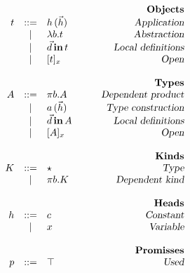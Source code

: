 \begin{figure}

\begin{center}
\begin{math}
\begin{array}{rclr}
&&&\qquad\textsl{\bf Objects}\\
t 

&::=& 
h\,(\vec{h}) 
& \qquad\textsl{Application}
\\

&|&
\lambda b. t
& \qquad\textsl{Abstraction}
\\

&|&
\vec{d} \,\textbf{in}\, t
& \qquad\textsl{Local definitions}
\\

&|&
[ t ]_{x}
& \qquad\textsl{Open}
\\
\\
&&&\qquad\textsl{\bf Types}\\
A

&::=& 
\pi b. A
& \qquad\textsl{Dependent product}
\\

&|& 
a\,(\vec{h})
& \qquad\textsl{Type construction}
\\

&|& 
\vec{d} \,\textbf{in}\, A
& \qquad\textsl{Local definitions}
\\


&|& 
[ A ]_{x}
& \qquad\textsl{Open}
\\
\\
&&&\qquad\textsl{\bf Kinds}\\
K

&::=&
\star
& \qquad\textsl{Type}
\\

&|&
\pi b. K
& \qquad\textsl{Dependent kind}
\\
\\

&&&\qquad\textsl{\bf Heads}\\
h

&::=& 
c
& \qquad\textsl{Constant}
\\
&|& 
x
& \qquad\textsl{Variable}
\\
\\
&&&\qquad\textsl{\bf Promisses}\\
p 

&::=&
\top
& \qquad\textsl{Used}
\\


\end{array}
\end{math}
\end{center}
\end{figure}
